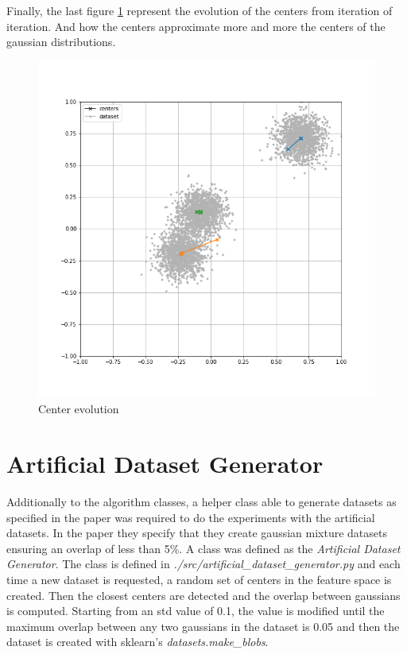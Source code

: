 Finally, the last figure \ref{fig:summary_iteration} represent the evolution of the centers from iteration of iteration. And how the centers approximate more and more the centers of the gaussian distributions.

\begin{figure}[!ht]
    \includegraphics[width=\linewidth]{images/summary_iteration.png}
    \caption{Center evolution}
    \label{fig:summary_iteration}
\end{figure}

\section{Artificial Dataset Generator}

Additionally to the algorithm classes, a helper class able to generate datasets as specified in the paper was required to do the experiments with the artificial datasets. In the paper they specify that they create gaussian mixture datasets ensuring an overlap of less than 5\%. A class was defined as the \textit{Artificial Dataset Generator}. The class is defined in \textit{./src/artificial\_dataset\_generator.py} and each time a new dataset is requested, a random set of centers in the feature space is created. Then the closest centers are detected and the overlap between gaussians is computed. Starting from an std value of 0.1, the value is modified until the maximum overlap between any two gaussians in the dataset is 0.05 and then the dataset is created with sklearn's \textit{datasets.make\_blobs}.
